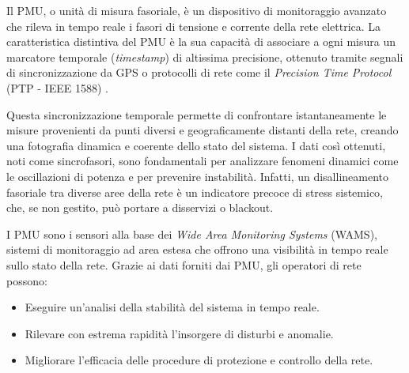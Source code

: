 Il PMU, o unità di misura fasoriale, è un dispositivo di monitoraggio avanzato che rileva in tempo reale i fasori di tensione e corrente della rete elettrica. La caratteristica distintiva del PMU è la sua capacità di associare a ogni misura un marcatore temporale (\textit{timestamp}) di altissima precisione, ottenuto tramite segnali di sincronizzazione da GPS o protocolli di rete come il \textit{Precision Time Protocol} (PTP - IEEE 1588) \cite{siemens-PMU}.


Questa sincronizzazione temporale permette di confrontare istantaneamente le misure provenienti da punti diversi e geograficamente distanti della rete, creando una fotografia dinamica e coerente dello stato del sistema. I dati così ottenuti, noti come sincrofasori, sono fondamentali per analizzare fenomeni dinamici come le oscillazioni di potenza e per prevenire instabilità. Infatti, un disallineamento fasoriale tra diverse aree della rete è un indicatore precoce di stress sistemico, che, se non gestito, può portare a disservizi o blackout.




I PMU sono i sensori alla base dei \textit{Wide Area Monitoring Systems} (WAMS), sistemi di monitoraggio ad area estesa che offrono una visibilità in tempo reale sullo stato della rete. Grazie ai dati forniti dai PMU, gli operatori di rete possono:


\begin{itemize}
    \item Eseguire un'analisi della stabilità del sistema in tempo reale.
    \item Rilevare con estrema rapidità l'insorgere di disturbi e anomalie.
    \item Migliorare l'efficacia delle procedure di protezione e controllo della rete.
\end{itemize}




